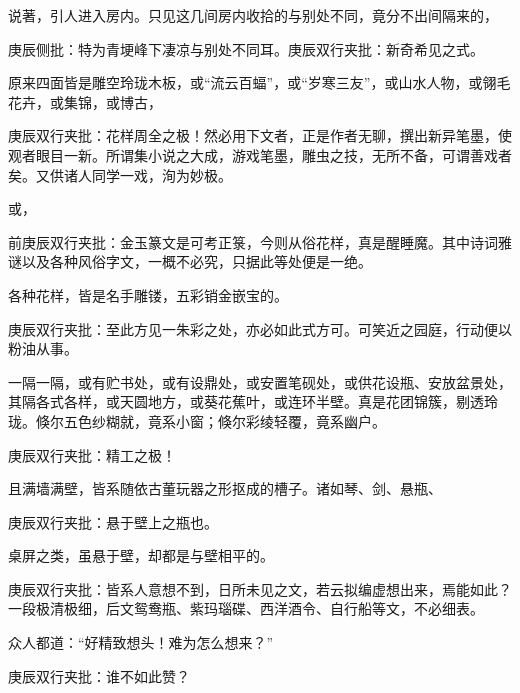 \begin{parag}
    说著，引人进入房内。只见这几间房内收拾的与别处不同，竟分不出间隔来的，\begin{note}庚辰侧批：特为青埂峰下凄凉与别处不同耳。庚辰双行夹批：新奇希见之式。\end{note}原来四面皆是雕空玲珑木板，或“流云百蝠”，或“岁寒三友”，或山水人物，或翎毛花卉，或集锦，或博古，\begin{note}庚辰双行夹批：花样周全之极！然必用下文者，正是作者无聊，撰出新异笔墨，使观者眼目一新。所谓集小说之大成，游戏笔墨，雕虫之技，无所不备，可谓善戏者矣。又供诸人同学一戏，洵为妙极。\end{note}或，\begin{note}前庚辰双行夹批：金玉篆文是可考正箓，今则从俗花样，真是醒睡魔。其中诗词雅谜以及各种风俗字文，一概不必究，只据此等处便是一绝。\end{note}各种花样，皆是名手雕镂，五彩销金嵌宝的。\begin{note}庚辰双行夹批：至此方见一朱彩之处，亦必如此式方可。可笑近之园庭，行动便以粉油从事。\end{note}一隔一隔，或有贮书处，或有设鼎处，或安置笔砚处，或供花设瓶、安放盆景处，其隔各式各样，或天圆地方，或葵花蕉叶，或连环半壁。真是花团锦簇，剔透玲珑。倏尔五色纱糊就，竟系小窗；倏尔彩绫轻覆，竟系幽户。\begin{note}庚辰双行夹批：精工之极！\end{note}且满墙满壁，皆系随依古董玩器之形抠成的槽子。诸如琴、剑、悬瓶、\begin{note}庚辰双行夹批：悬于壁上之瓶也。\end{note}桌屏之类，虽悬于壁，却都是与壁相平的。\begin{note}庚辰双行夹批：皆系人意想不到，日所未见之文，若云拟编虚想出来，焉能如此？一段极清极细，后文鸳鸯瓶、紫玛瑙碟、西洋酒令、自行船等文，不必细表。\end{note}众人都道：“好精致想头！难为怎么想来？”\begin{note}庚辰双行夹批：谁不如此赞？\end{note}
\end{parag}


